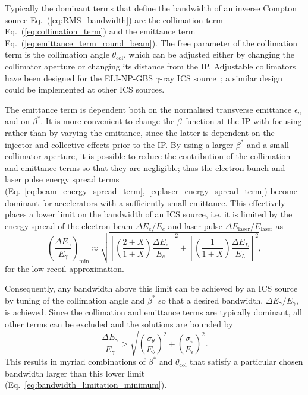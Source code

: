\documentclass[../main.tex]{subfiles}
\begin{document}
Typically the dominant terms that define the bandwidth of an inverse Compton source Eq.~(\ref{eq:RMS_bandwidth}) are the collimation term Eq.~(\ref{eq:collimation_term}) and the emittance term Eq.~(\ref{eq:emittance_term_round_beam}). The free parameter of the collimation term is the collimation angle $\theta_{\mathrm{col}}$, which can be adjusted either by changing the collimator aperture or changing its distance from the IP. Adjustable collimators have been designed for the ELI-NP-GBS $\gamma$-ray ICS source~\cite{paterno2017collimation}; a similar design could be implemented at other ICS sources.

The emittance term is dependent both on the normalised transverse emittance $\epsilon_{n}$ and on $\beta^{*}$. It is more convenient to change the $\beta$-function at the IP with focusing rather than by varying the emittance, since the latter is dependent on the injector and collective effects prior to the IP. By using a larger $\beta^{*}$ and a small collimator aperture, it is possible to reduce the contribution of the collimation and emittance terms so that they are negligible; thus the electron bunch and laser pulse energy spread terms (Eq.~\ref{eq:beam_energy_spread_term},~\ref{eq:laser_energy_spread_term}) become dominant for accelerators with a sufficiently small emittance. This effectively places a lower limit on the bandwidth of an ICS source, i.e. it is limited by the energy spread of the electron beam $\Delta E_{e}/E_{e}$ and laser pulse $\Delta E_{\mathrm{laser}}/E_{\mathrm{laser}}$ as 
\begin{equation}
\left(\frac{\Delta E_{\gamma}}{E_{\gamma}}\right)_{\mathrm{min}} \approx \sqrt{\left[\left(\frac{2+X}{1+X}\right)\frac{\Delta E_{e}}{E_{e}}\right]^{2} + \left[\left(\frac{1}{1+X}\right)\frac{\Delta E_{L}}{E_{L}}\right]^{2}},
\label{eq:bandwidth_limitation_minimum}
\end{equation}
for the low recoil approximation.

Consequently, any bandwidth above this limit can be achieved by an ICS source by tuning of the collimation angle and $\beta^*$ so that a desired bandwidth, $\Delta E_{\gamma}/E_{\gamma}$, is achieved. Since the collimation and emittance terms are typically dominant, all other terms can be excluded and the solutions are bounded by
\begin{equation}
\frac{\Delta E_{\gamma}}{E_{\gamma}} > \sqrt{\left(\frac{ \sigma_{\theta}}{E_{\theta}}\right)^{2}+\left(\frac{\sigma_{\epsilon}}{E_{\epsilon}}\right)^{2}}.    
\end{equation}
This results in myriad combinations of $\beta^{*}$ and $\theta_{\mathrm{col}}$ that satisfy a particular chosen bandwidth larger than this lower limit (Eq.~\ref{eq:bandwidth_limitation_minimum}).
\end{document}
